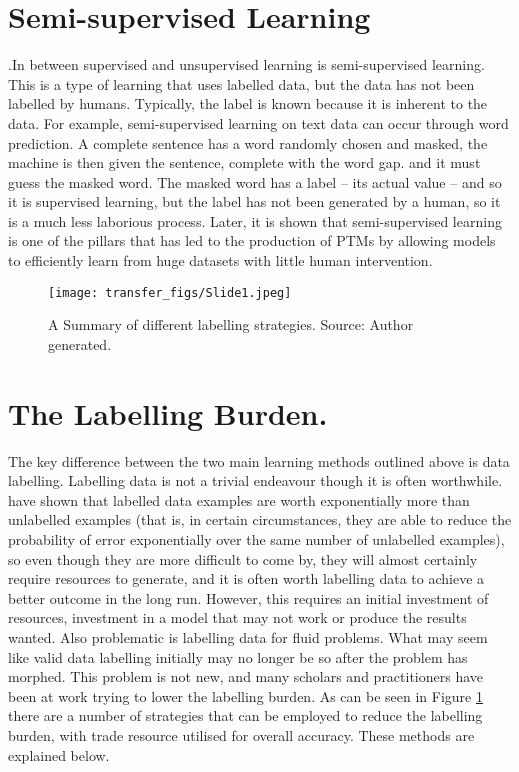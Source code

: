 \section{Semi-supervised Learning}.In between supervised and unsupervised learning is semi-supervised learning. This is a type of learning that uses labelled data, but the data has not been labelled by humans. Typically, the label is known because it is inherent to the data. For example, semi-supervised learning on text data can occur through word prediction. A complete sentence has a word randomly chosen and masked, the machine is then given the sentence, complete with the word gap. and it must guess the masked word. The masked word has a label  –  its actual value  –  and so it is supervised learning, but the label has not been generated by a human, so it is a much less laborious process. Later, it is shown that semi-supervised learning is one of the pillars that has led to the production of PTMs by allowing models to efficiently learn from huge datasets with little human intervention.

\begin{figure}
  \texttt{[image: transfer\_figs/Slide1.jpeg]}
  \caption{A Summary of different labelling strategies. Source: Author generated.}
  \label{fig:label}
\end{figure}

\section{The Labelling Burden.} The key difference between the two main learning methods outlined above is data labelling. Labelling data is not a trivial endeavour though it is often worthwhile.\textcite{castelli1995exponential}  have shown that labelled data examples are worth exponentially more than unlabelled examples (that is, in certain circumstances, they are able to reduce the probability of error exponentially over the same number of unlabelled examples), so even though they are more difficult to come by, they will almost certainly require resources to generate, and it is often worth labelling data to achieve a better outcome in the long run. However, this requires an initial investment of resources, investment in a model that may not work or produce the results wanted. Also problematic is labelling data for fluid problems. What may seem like valid data labelling initially may no longer be so after the problem has morphed. This problem is not new, and many scholars and practitioners have been at work trying to lower the labelling burden. As can be seen in Figure \ref{fig:label} there are a number of strategies that can be employed to reduce the labelling burden, with trade resource utilised for overall accuracy. These methods are explained below.



